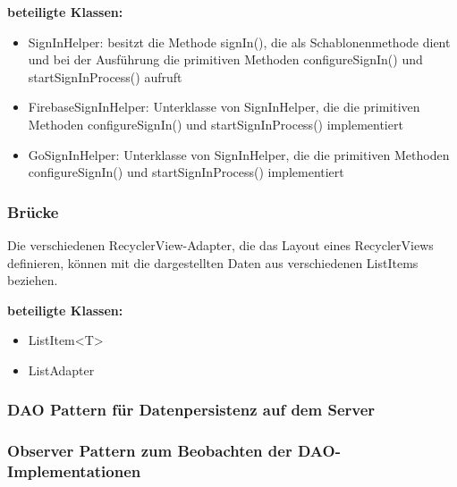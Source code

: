 \documentclass[11pt,a4paper]{report}
\begin{document}
\textbf{beteiligte Klassen:}
\begin{itemize}
	\item SignInHelper: besitzt die Methode signIn(), die als Schablonenmethode dient und bei der Ausführung die primitiven Methoden configureSignIn() und startSignInProcess() aufruft
	\item FirebaseSignInHelper: Unterklasse von SignInHelper, die die primitiven Methoden configureSignIn() und startSignInProcess() implementiert
	\item GoSignInHelper: Unterklasse von SignInHelper, die die primitiven Methoden configureSignIn() und startSignInProcess() implementiert
\end{itemize}

\subsubsection{Brücke}
Die verschiedenen RecyclerView-Adapter, die das Layout eines RecyclerViews definieren, können mit die dargestellten Daten aus verschiedenen ListItems beziehen.

\textbf{beteiligte Klassen:}
\begin{itemize}
	\item ListItem<T>
	\item ListAdapter
\end{itemize}

\subsubsection{DAO Pattern für Datenpersistenz auf dem Server}

\subsubsection{Observer Pattern zum Beobachten der DAO-Implementationen}
\end{document}
